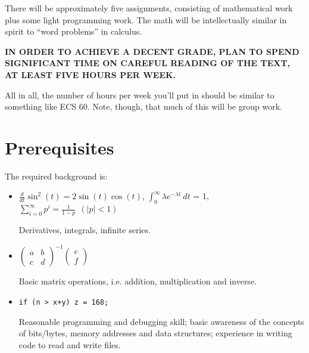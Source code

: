There will be approximately five assignments, consisting of mathematical
work plus some light programming work.  The math will be
intellectually similar in spirit to ``word problems'' in calculus.

{\bf IN ORDER TO ACHIEVE A DECENT GRADE, PLAN TO SPEND SIGNIFICANT TIME
ON CAREFUL READING OF THE TEXT, AT LEAST FIVE HOURS PER WEEK.}

All in all, the number of hours per week you'll put in should be similar
to something like ECS 60.  Note, though, that much of this will be group
work.





\section{Prerequisites}

The required background is:

\begin{itemize}

\item 
$\frac{d}{dt} \sin^2(t) = 2 \sin(t) \cos(t)$, 
\hspace{0.25in}
$\int_{0}^{\infty} \lambda e^{-\lambda t} ~ dt$ = 1,
\hspace{0.25in}
$\sum_{i=0}^{\infty} p^i = \frac{1}{1-p} ~~ (|p| < 1)$

Derivatives, integrals, infinite series.

\item 
$
\left (         
\begin{array}{cc}
a & b \\
c & d
\end{array}
\right )^{-1}     
\left (         
\begin{array}{c}
e \\
f
\end{array}
\right )
$

Basic matrix operations, i.e. addition, multiplication and inverse.

\item {\tt if (n > x+y) z = 168;}

Reasonable programming and debugging skill; basic awareness of the
concepts of bits/bytes, memory addresses and data structures; experience
in writing code to read and write files.

\end{itemize}


